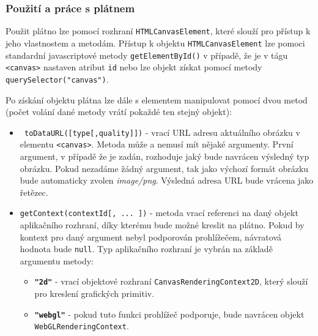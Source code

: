 \subsubsection*{Použití a práce s plátnem}
Použit plátno lze pomocí rozhraní \texttt{HTMLCanvasElement}, které slouží pro přístup k jeho vlastnostem a metodám. Přístup k objektu \texttt{HTMLCanvasElement} lze pomoci standardní javascriptové metody \texttt{getElementById()} v případě, že je v tágu \texttt{<canvas>} nastaven atribut \texttt{id} nebo lze objekt získat pomocí metody \texttt{querySelector("canvas")}.

Po získání objektu plátna lze dále s elementem manipulovat pomocí dvou metod (počet volání dané metody vrátí pokaždé ten stejný objekt):
	 	\begin{itemize}		
			\item \texttt{ toDataURL([type[,quality]])} \newline
			 - vrací URL adresu aktuálního obrázku v elementu \texttt{<canvas>}. Metoda může a nemusí mít nějaké argumenty. První argument, v případě že je zadán, rozhoduje jaký bude navrácen výsledný typ obrázku. Pokud nezadáme žádný argument, tak jako výchozí formát obrázku bude automaticky zvolen \textit{image/png}. Výsledná adresa URL bude vrácena jako řetězec. \cite{html5}
			
			\item \texttt{getContext(contextId[, ... ])}\newline
			 - metoda vrací referenci na daný objekt aplikačního rozhraní, díky kterému bude možné kreslit na plátno. Pokud by kontext pro daný argument nebyl podporován prohlížečem, návratová hodnota bude \texttt{null}. Typ aplikačního rozhraní je vybrán na základě argumentu metody:
			 \begin{itemize}
			 	\item  \texttt{\textbf{"2d"}} - vrací objektové rozhraní \texttt{CanvasRenderingContext2D}, který slouží pro kreslení grafických primitiv.
			 	
			 	\item \texttt{\textbf{"webgl"}} - pokud tuto funkci prohlížeč podporuje, bude navrácen objekt \newline \texttt{WebGLRenderingContext}. 
			 \end{itemize}
		 
 
		\end{itemize}

\newpage


